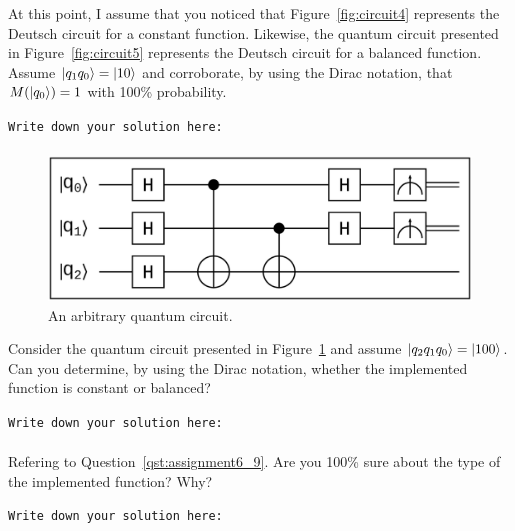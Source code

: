 \begin{question}
At this point, I assume that you noticed that Figure~\ref{fig:circuit4} represents the Deutsch circuit for a constant function. Likewise, the quantum circuit presented in Figure~\ref{fig:circuit5} represents the Deutsch circuit for a balanced function. Assume $\ket{q_{1}q_{0}} = \ket{10}$ and corroborate, by using the Dirac notation, that $M(\ket{q_{0}}) = 1$ with 100\% probability.
\label{qst:assignment6_8}
\end{question}
{\small
\texttt{Write down your solution here:}
\begin{equation*}
  \begin{split}
  \end{split}
\end{equation*}}
\vspace{0.1cm}

\begin{figure}[t]
  \centerline{\includegraphics[scale=0.25]{img/qci_a6_question9.ps}}
  \caption{An arbitrary quantum circuit.}
  \label{fig:circuit6}
\end{figure}

\begin{question}
Consider the quantum circuit presented in Figure~\ref{fig:circuit6} and assume $\ket{q_{2}q_{1}q_{0}} = \ket{100}$. Can you determine, by using the Dirac notation, whether the implemented function is constant or balanced?
\label{qst:assignment6_9}
\end{question}
{\small
\texttt{Write down your solution here:}
\begin{equation*}
  \begin{split}
  \end{split}
\end{equation*}}
\vspace{0.1cm}

\begin{question}
Refering to Question~\ref{qst:assignment6_9}. Are you 100\% sure about the type of the implemented function? Why?
\label{qst:assignment6_10}
\end{question}
{\small
\texttt{Write down your solution here:}}
